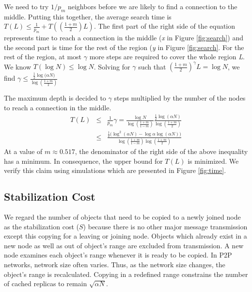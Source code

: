 \documentclass[conference]{IEEEtran}
\begin{document}
We need to try $1/p_m$ neighbors before
we are likely to find a connection to the middle.  Putting this together,
the average search time is
$T(L) \leq \frac{1}{p_m} + T((\frac{1+m}{2})L)$. 
The first part of the right side of the equation represents time to reach 
a connection in the middle (\textit{x} in Figure \ref{fig:search}) and 
the second part is time for the rest of the region (\textit{y} in Figure \ref{fig:search}. 
For the rest of the region, at most $\gamma$ more steps are required to 
cover the whole region \textit{L}. We know $T(\log{N}) \leq \log N$. 
Solving for $\gamma$ such that $(\frac{1+m}{2})^{\gamma}L = \log N$, we
find $\gamma \leq \frac{\frac{1}{2}\log{(\alpha N})}{\log{(\frac{1+m}{2})}}$

The maximum depth is decided to $\gamma$ steps multiplied by the number of the nodes 
to reach a connection in the middle.
\begin{eqnarray*}
T(L) &\leq& \frac{1}{p_m}\gamma = \frac{\log N}{\log{(\frac{1+m}{1-m})}}\frac{\frac{1}{2}\log{(\alpha N)}}{\log{(\frac{1+m}{2})}}
 \\
     &\leq& \frac{\frac{1}{2}(\log^2 (\alpha N)-\log{\alpha}\log{(\alpha N))}}{\log{(\frac{1+m}{1-m})}\log{(\frac{1+m}{2})}}
\end{eqnarray*}
At a value of $m\approx0.517$, the denominator of the right side of the above inequality has a minimum. 
In consequence, the upper bound for $T(L)$ is minimized.
We verify this claim using simulations which are presented in Figure \ref{fig:time}. 

\subsection{Stabilization Cost}
\label{sec:stabilization_cost}
We regard the number of objects that need to be copied to 
a newly joined node as the stabilization cost ($S$) 
because there is no other major message transmission 
except this copying for a leaving or joining node. 
Objects which already exist in a new node as well as out of 
object's range are excluded from transmission.
A new node examines each object's range whenever it is ready to be copied.
In P2P networks, network size often varies. Thus, as the network
size changes, the object's range is recalculated.
Copying in a redefined range constrains the number of 
cached replicas to remain $\sqrt{\alpha N}$.
 
\end{document}
